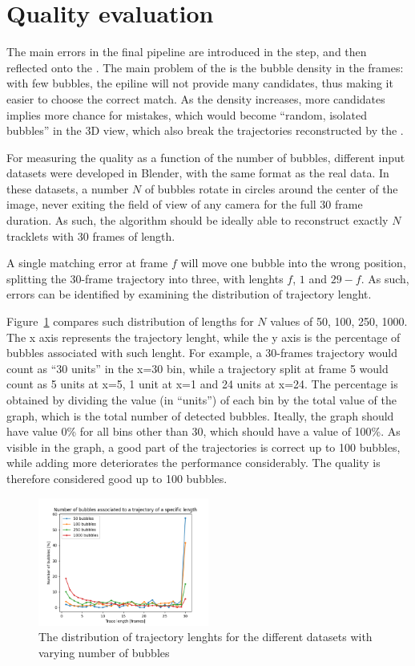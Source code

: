 \section{Quality evaluation}

The main errors in the final pipeline are introduced in the \match* step, and then reflected onto the \linkDDD*.
The main problem of the \match*  is the bubble density in the frames: with few bubbles, the epiline will not provide many candidates, thus making it easier to choose the correct match.
As the density increases, more candidates implies more chance for mistakes, which would become ``random, isolated bubbles'' in the 3D view, which also break the trajectories reconstructed by the \link*.

For measuring the quality as a function of the number of bubbles, different input datasets were developed in Blender, with the same format as the real data.
In these datasets, a number $N$ of bubbles rotate in circles around the center of the image, never exiting the field of view of any camera for the full 30 frame duration.
As such, the algorithm should be ideally able to reconstruct exactly $N$ tracklets with 30 frames of length.

A single matching error at frame $f$ will move one bubble into the wrong position, splitting the 30-frame trajectory into three, with lenghts $f$, $1$ and $29-f$.
As such, errors can be identified by examining the distribution of trajectory lenght.

Figure~\ref{fig:traj-len-distr} compares such distribution of lengths for $N$ values of 50, 100, 250, 1000.
The x axis represents the trajectory lenght, while the y axis is the percentage of bubbles associated with such lenght.
For example, a 30-frames trajectory would count as ``30 units'' in the x=30 bin, while a trajectory split at frame 5 would count as 5 units at x=5, 1 unit at x=1 and 24 units at x=24.
The percentage is obtained by dividing the value (in ``units'') of each bin by the total value of the graph, which is the total number of detected bubbles.
Iteally, the graph should have value 0\% for all bins other than 30, which should have a value of 100\%.
As visible in the graph, a good part of the trajectories is correct up to 100 bubbles, while adding more deteriorates the performance considerably.
The quality is therefore considered good up to 100 bubbles.

\begin{figure}
	\centerline{\includegraphics[width=0.5\textwidth]{images/traj-len-graph.png}}
	\caption{\centering The distribution of trajectory lenghts for the different datasets with varying number of bubbles}
	\label{fig:traj-len-distr}
\end{figure}
